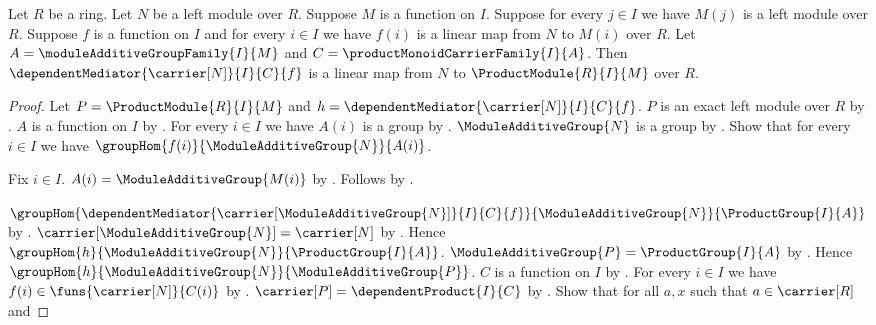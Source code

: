 \begin{theorem}\label{product_module_mediator_linear}
    Let $R$ be a ring.
    Let $N$ be a left module over $R$.
    Suppose $M$ is a function on $I$.
    Suppose for every $j\in I$ we have $M(j)$ is a left module over $R$.
    Suppose $f$ is a function on $I$ and for every $i\in I$ we have
        $f(i)$ is a linear map from $N$ to $M(i)$ over $R$.
    Let $A=\moduleAdditiveGroupFamily{I}{M}$ and
        $C=\productMonoidCarrierFamily{I}{A}$.
    Then $\dependentMediator{\carrier[N]}{I}{C}{f}$ is a linear map
        from $N$ to $\ProductModule{R}{I}{M}$ over $R$.
\end{theorem}
\begin{proof}
    Let $P=\ProductModule{R}{I}{M}$ and
        $h=\dependentMediator{\carrier[N]}{I}{C}{f}$.
    $P$ is an exact left module over $R$ by
        .
    $A$ is a function on $I$ by
        .
    For every $i\in I$ we have $A(i)$ is a group by
        .
    $\ModuleAdditiveGroup{N}$ is a group by
        .
    Show that for every $i\in I$ we have
        $\groupHom{f(i)}{\ModuleAdditiveGroup{N}}{A(i)}$.
    \begin{subproof}
        Fix $i\in I$.
        $A(i)=\ModuleAdditiveGroup{M(i)}$ by
            .
        Follows by .
    \end{subproof}
    $\groupHom{\dependentMediator{\carrier[\ModuleAdditiveGroup{N}]}{
        I}{C}{f}}{\ModuleAdditiveGroup{N}}{\ProductGroup{I}{A}}$ by
        .
    $\carrier[\ModuleAdditiveGroup{N}]=\carrier[N]$ by
        .
    Hence $\groupHom{h}{\ModuleAdditiveGroup{N}}{
        \ProductGroup{I}{A}}$.
    $\ModuleAdditiveGroup{P}=\ProductGroup{I}{A}$ by
        .
    Hence $\groupHom{h}{\ModuleAdditiveGroup{N}}{
        \ModuleAdditiveGroup{P}}$.
    $C$ is a function on $I$ by
        .
    For every $i\in I$ we have
        $f(i)\in\funs{\carrier[N]}{C(i)}$ by
        .
    $\carrier[P]=\dependentProduct{I}{C}$ by
        .
    Show that for all $a,x$ such that $a\in\carrier[R]$ and

\end{proof}
